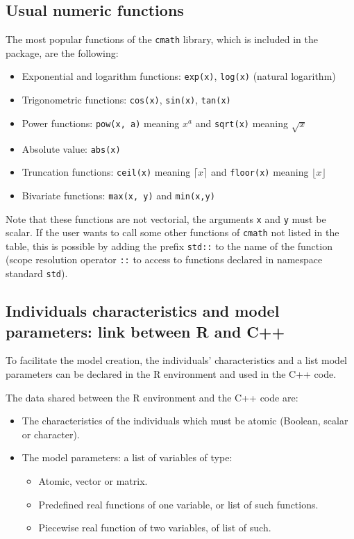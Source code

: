 \hypertarget{usual-numeric-functions}{%
\subsection{Usual numeric functions}\label{usual-numeric-functions}}

The most popular functions of the \texttt{cmath} library, which is included in the package, are the following:

\begin{itemize}
\tightlist
\item
  Exponential and logarithm functions: \texttt{exp(x)}, \texttt{log(x)} (natural logarithm)
\item
  Trigonometric functions: \texttt{cos(x)}, \texttt{sin(x)}, \texttt{tan(x)}
\item
  Power functions: \texttt{pow(x,\ a)} meaning \(x^a\) and \texttt{sqrt(x)} meaning \(\sqrt{x}\)
\item
  Absolute value: \texttt{abs(x)}
\item
  Truncation functions: \texttt{ceil(x)} meaning \(\lceil x \rceil\) and \texttt{floor(x)} meaning \(\lfloor x \rfloor\)
\item
  Bivariate functions: \texttt{max(x,\ y)} and \texttt{min(x,y)}
\end{itemize}

Note that these functions are not vectorial, the arguments \texttt{x} and \texttt{y} must be scalar. If the user wants to call some other functions of \texttt{cmath} not listed in the table, this is possible by adding the prefix \texttt{std::} to the name of the function (scope resolution operator \texttt{::} to access to functions declared in namespace standard \texttt{std}).

\hypertarget{cppcharacteristics}{%
\subsection{Individuals characteristics and model parameters: link between R and C++}\label{cppcharacteristics}}

To facilitate the model creation, the individuals' characteristics and a list model parameters can be declared in the R environment and used in the C++ code.

The data shared between the R environment and the C++ code are:

\begin{itemize}
\tightlist
\item
  The characteristics of the individuals which must be atomic (Boolean, scalar or character).
\item
  The model parameters: a list of variables of type:

  \begin{itemize}
  \tightlist
  \item
    Atomic, vector or matrix.
  \item
    Predefined real functions of one variable, or list of such functions.
  \item
    Piecewise real function of two variables, of list of such.
  \end{itemize}
\end{itemize}


